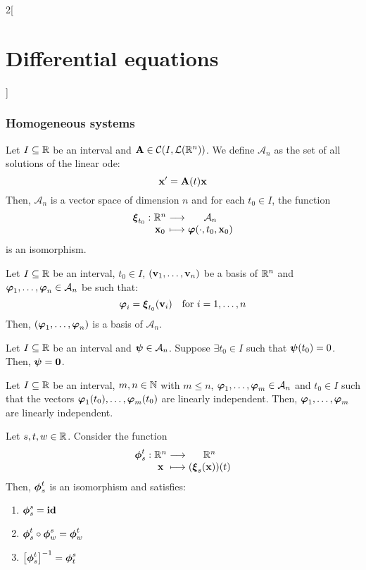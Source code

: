 \documentclass[../../../main_math.tex]{subfiles}
\begin{document}
\begin{multicols}{2}[\section{Differential equations}]
  \subsubsection{Homogeneous systems}
  \begin{theorem}
    Let $I\subseteq\mathbb{R}$ be an interval and $\boldsymbol{\mathrm{A}}\in\mathcal{C}(I,\mathcal{L}(\mathbb{R}^n))$. We define $\mathcal{A}_n$ as the set of all solutions of the linear ode:
    \begin{equation}\label{DE_homo}
      \boldsymbol{\mathrm{x}}'=\boldsymbol{\mathrm{A}}(t)\boldsymbol{\mathrm{x}}
    \end{equation} Then, $\mathcal{A}_n$ is a vector space of dimension $n$ and for each $t_0\in I$, the function
    $$
      \function{\vf{\xi}_{t_0}}{\RR^n}{\mathcal{A}_n}{\vf{x}_0}{\vf{\varphi}(\cdot,t_0,\vf{x}_0)}
    $$
    is an isomorphism.
  \end{theorem}
  \begin{corollary}
    Let $I\subseteq\mathbb{R}$ be an interval, $t_0\in I$, $(\boldsymbol{\mathrm{v}}_1,\ldots,\boldsymbol{\mathrm{v}}_n)$ be a basis of $\mathbb{R}^n$ and $\boldsymbol{\mathrm{\varphi}}_1,\ldots,\boldsymbol{\mathrm{\varphi}}_n\in\mathcal{A}_n$ be such that: $$\boldsymbol{\mathrm{\varphi}}_i=\boldsymbol{\mathrm{\xi}}_{t_0}(\boldsymbol{\mathrm{v}}_i)\quad\text{for } i=1,\ldots,n$$
    Then, $(\boldsymbol{\mathrm{\varphi}}_1,\ldots,\boldsymbol{\mathrm{\varphi}}_n)$ is a basis of $\mathcal{A}_n$.
  \end{corollary}
  \begin{corollary}
    Let $I\subseteq\mathbb{R}$ be an interval and $\boldsymbol{\mathrm{\psi}}\in\mathcal{A}_n$. Suppose $\exists t_0\in I$ such that $\boldsymbol{\mathrm{\psi}} (t_0)=0$. Then, $\boldsymbol{\mathrm{\psi}}=\boldsymbol{\mathrm{0}}$.
  \end{corollary}
  \begin{corollary}
    Let $I\subseteq\mathbb{R}$ be an interval, $m,n\in\mathbb{N}$ with $m\leq n$, $\boldsymbol{\mathrm{\varphi}}_1,\ldots,\boldsymbol{\mathrm{\varphi}}_m\in\mathcal{A}_n$ and $t_0\in I$ such that the vectors $\boldsymbol{\mathrm{\varphi}}_1(t_0),\ldots,\boldsymbol{\mathrm{\varphi}}_m(t_0)$ are linearly independent. Then, $\boldsymbol{\mathrm{\varphi}}_1,\ldots,\boldsymbol{\mathrm{\varphi}}_m$ are linearly independent.
  \end{corollary}
  \begin{corollary}
    Let $s,t,w\in\mathbb{R}$. Consider the function
    $$
      \function{\vf{\phi}_s^t}{\RR^n}{\RR^n}{\vf{x}}{(\vf{\xi}_s(\vf{x}))(t)}
    $$
    Then, $\boldsymbol{\mathrm{\phi}}_s^t$ is an isomorphism and satisfies:
    \begin{enumerate}
      \item $\boldsymbol{\mathrm{\phi}}_s^s=\boldsymbol{\mathrm{\mathrm{id}}}$
      \item $\boldsymbol{\mathrm{\phi}}_s^t\circ\boldsymbol{\mathrm{\phi}}_w^s=\boldsymbol{\mathrm{\phi}}_w^t$
      \item ${\left[\boldsymbol{\mathrm{\phi}}_s^t\right]}^{-1}=\boldsymbol{\mathrm{\phi}}_t^s$

\end{enumerate}
\end{corollary}
\end{multicols}
\end{document}

